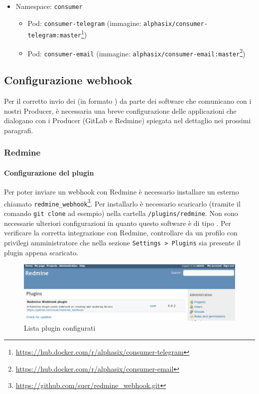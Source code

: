\begin{itemize}
	\item Namespace: \texttt{consumer}
	\begin{itemize}
		\item Pod: \texttt{consumer-telegram} (immagine: \texttt{alphasix/consumer-telegram:master}\footnote{\url{https://hub.docker.com/r/alphasix/consumer-telegram}})
		\item Pod: \texttt{consumer-email} (immagine: \texttt{alphasix/consumer-email:master}\footnote{\url{https://hub.docker.com/r/alphasix/consumer-email}})
	\end{itemize}
\end{itemize}


\subsection{Configurazione webhook}
Per il corretto invio dei  (in formato ) da parte dei software che comunicano con i nostri Producer, è necessaria una breve configurazione delle applicazioni che dialogano con i Producer (GitLab e Redmine) spiegata nel dettaglio nei prossimi paragrafi.

	\subsubsection{Redmine}
	\paragraph{Configurazione del plugin}
	Per poter inviare un webhook con Redmine è necessario installare un  esterno chiamato \texttt{redmine\_webhook}\footnote{\url{https://github.com/suer/redmine_webhook.git}}.
	Per installarlo è necessario scaricarlo (tramite il comando \texttt{git clone} ad esempio) nella cartella \texttt{/plugins/redmine}.
	Non sono necessarie ulteriori configurazioni in quanto questo software è di tipo .
	Per verificare la corretta integrazione con Redmine, controllare da un profilo con privilegi amministratore che nella sezione \texttt{Settings > Plugins} sia presente il plugin appena scaricato.
	\begin{figure}[H]
		\centering
		\includegraphics[width=14cm]{img/redmine_webhook_admin.png}
		\caption{Lista plugin configurati}
	\end{figure}


